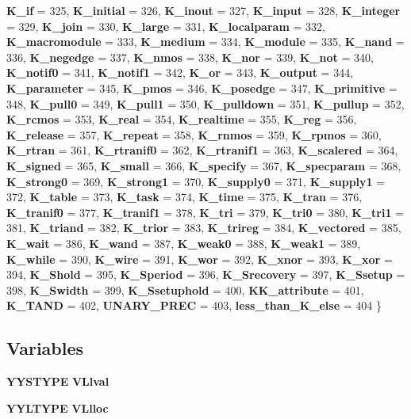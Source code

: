 \begin{CompactItemize}
{\bf K\_\-if} =  325, 
{\bf K\_\-initial} =  326, 
{\bf K\_\-inout} =  327, 
{\bf K\_\-input} =  328, 
{\bf K\_\-integer} =  329, 
{\bf K\_\-join} =  330, 
{\bf K\_\-large} =  331, 
{\bf K\_\-localparam} =  332, 
{\bf K\_\-macromodule} =  333, 
{\bf K\_\-medium} =  334, 
{\bf K\_\-module} =  335, 
{\bf K\_\-nand} =  336, 
{\bf K\_\-negedge} =  337, 
{\bf K\_\-nmos} =  338, 
{\bf K\_\-nor} =  339, 
{\bf K\_\-not} =  340, 
{\bf K\_\-notif0} =  341, 
{\bf K\_\-notif1} =  342, 
{\bf K\_\-or} =  343, 
{\bf K\_\-output} =  344, 
{\bf K\_\-parameter} =  345, 
{\bf K\_\-pmos} =  346, 
{\bf K\_\-posedge} =  347, 
{\bf K\_\-primitive} =  348, 
{\bf K\_\-pull0} =  349, 
{\bf K\_\-pull1} =  350, 
{\bf K\_\-pulldown} =  351, 
{\bf K\_\-pullup} =  352, 
{\bf K\_\-rcmos} =  353, 
{\bf K\_\-real} =  354, 
{\bf K\_\-realtime} =  355, 
{\bf K\_\-reg} =  356, 
{\bf K\_\-release} =  357, 
{\bf K\_\-repeat} =  358, 
{\bf K\_\-rnmos} =  359, 
{\bf K\_\-rpmos} =  360, 
{\bf K\_\-rtran} =  361, 
{\bf K\_\-rtranif0} =  362, 
{\bf K\_\-rtranif1} =  363, 
{\bf K\_\-scalered} =  364, 
{\bf K\_\-signed} =  365, 
{\bf K\_\-small} =  366, 
{\bf K\_\-specify} =  367, 
{\bf K\_\-specparam} =  368, 
{\bf K\_\-strong0} =  369, 
{\bf K\_\-strong1} =  370, 
{\bf K\_\-supply0} =  371, 
{\bf K\_\-supply1} =  372, 
{\bf K\_\-table} =  373, 
{\bf K\_\-task} =  374, 
{\bf K\_\-time} =  375, 
{\bf K\_\-tran} =  376, 
{\bf K\_\-tranif0} =  377, 
{\bf K\_\-tranif1} =  378, 
{\bf K\_\-tri} =  379, 
{\bf K\_\-tri0} =  380, 
{\bf K\_\-tri1} =  381, 
{\bf K\_\-triand} =  382, 
{\bf K\_\-trior} =  383, 
{\bf K\_\-trireg} =  384, 
{\bf K\_\-vectored} =  385, 
{\bf K\_\-wait} =  386, 
{\bf K\_\-wand} =  387, 
{\bf K\_\-weak0} =  388, 
{\bf K\_\-weak1} =  389, 
{\bf K\_\-while} =  390, 
{\bf K\_\-wire} =  391, 
{\bf K\_\-wor} =  392, 
{\bf K\_\-xnor} =  393, 
{\bf K\_\-xor} =  394, 
{\bf K\_\-Shold} =  395, 
{\bf K\_\-Speriod} =  396, 
{\bf K\_\-Srecovery} =  397, 
{\bf K\_\-Ssetup} =  398, 
{\bf K\_\-Swidth} =  399, 
{\bf K\_\-Ssetuphold} =  400, 
{\bf KK\_\-attribute} =  401, 
{\bf K\_\-TAND} =  402, 
{\bf UNARY\_\-PREC} =  403, 
{\bf less\_\-than\_\-K\_\-else} =  404
 \}
\end{CompactItemize}
\subsection*{Variables}
\begin{CompactItemize}
\item 
{\bf YYSTYPE} {\bf VLlval}
\item 
{\bf YYLTYPE} {\bf VLlloc}
\end{CompactItemize}


